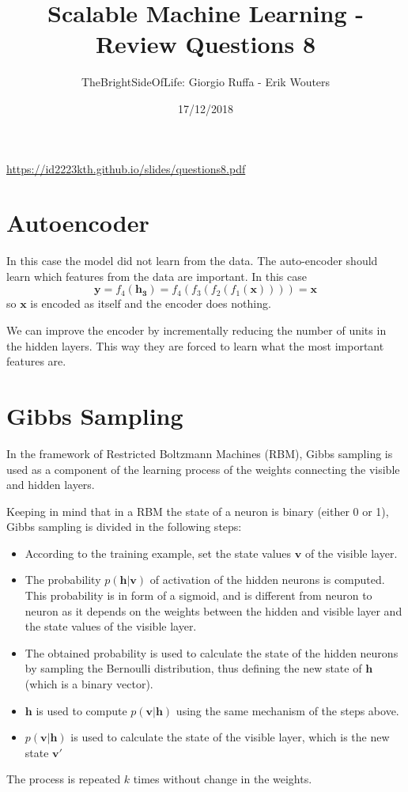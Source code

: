 \documentclass[a4paper]{article}
\title{Scalable Machine Learning - Review Questions 8}
\author{TheBrightSideOfLife: Giorgio Ruffa - Erik Wouters}
\date{17/12/2018}
\begin{document}
\maketitle

\url{https://id2223kth.github.io/slides/questions8.pdf}

\section{Autoencoder}
In this case the model did not learn from the data. The auto-encoder should learn which features from the data are important. In this case
\begin{equation}
    \mathbf{y} = f_4(\mathbf{h_3}) = f_4(f_3(f_2(f_1(\mathbf{x})))) = \mathbf{x}
\end{equation}
so $\mathbf{x}$ is encoded as itself and the encoder does nothing.

We can improve the encoder by incrementally reducing the number of units in the hidden layers. This way they are forced to learn what the most important features are.

\section{Gibbs Sampling}
In the framework of Restricted Boltzmann Machines (RBM), Gibbs sampling is used as a component of the learning process of the weights connecting the visible and hidden layers.

Keeping in mind that in a RBM the state of a neuron is binary (either 0 or 1),
Gibbs sampling is divided in the following steps:
\begin{itemize}
    \item According to the training example, set the state values $\mathbf{v}$ of the visible layer. 
    \item The probability $p(\mathbf{h} | \mathbf{v})$ of activation of the hidden neurons is computed. This probability is in form of a sigmoid, and is different from neuron to neuron as it depends on the weights between the hidden and visible layer and the state values of the visible layer.
    \item The obtained probability is used to calculate the state of the hidden neurons by sampling the Bernoulli distribution, thus defining the new state of $\mathbf{h}$ (which is a binary vector).
    \item $\mathbf{h}$ is used to compute $p(\mathbf{v} | \mathbf{h})$ using the same mechanism of the steps above.
    \item $p(\mathbf{v} | \mathbf{h})$ is used to calculate the state of the visible layer, which is the new state $\mathbf{v}\prime$
\end{itemize}
The process is repeated $k$ times without change in the weights.
\end{document}

